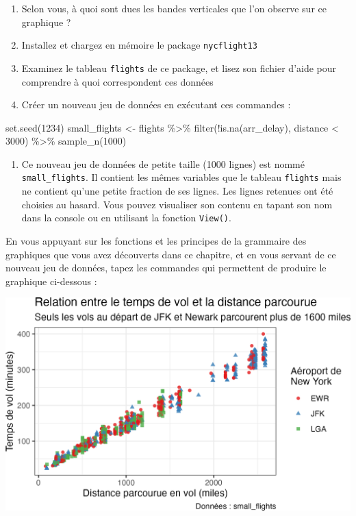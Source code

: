 \documentclass[
  letterpaper,
  DIV=11,
  numbers=noendperiod]{scrreprt}
\newenvironment{Shaded}{\begin{snugshade}}{\end{snugshade}}
\newcommand{\DecValTok}[1]{\textcolor[rgb]{0.68,0.00,0.00}{#1}}
\newcommand{\FunctionTok}[1]{\textcolor[rgb]{0.28,0.35,0.67}{#1}}
\newcommand{\NormalTok}[1]{\textcolor[rgb]{0.00,0.23,0.31}{#1}}
\newcommand{\OtherTok}[1]{\textcolor[rgb]{0.00,0.23,0.31}{#1}}
\newcommand{\SpecialCharTok}[1]{\textcolor[rgb]{0.37,0.37,0.37}{#1}}
\providecommand{\tightlist}{%
  \setlength{\itemsep}{0pt}\setlength{\parskip}{0pt}}\usepackage{longtable,booktabs,array}
\begin{document}
\begin{enumerate}
\def\labelenumi{\arabic{enumi}.}
\setcounter{enumi}{2}
\item
  Selon vous, à quoi sont dues les bandes verticales que l'on observe
  sur ce graphique ?
\item
  Installez et chargez en mémoire le package \texttt{nycflight13}
\item
  Examinez le tableau \texttt{flights} de ce package, et lisez son
  fichier d'aide pour comprendre à quoi correspondent ces données
\item
  Créer un nouveau jeu de données en exécutant ces commandes :
\end{enumerate}

\begin{Shaded}
\begin{Highlighting}[]
\FunctionTok{set.seed}\NormalTok{(}\DecValTok{1234}\NormalTok{)}
\NormalTok{small\_flights }\OtherTok{\textless{}{-}}\NormalTok{ flights }\SpecialCharTok{\%\textgreater{}\%}
  \FunctionTok{filter}\NormalTok{(}\SpecialCharTok{!}\FunctionTok{is.na}\NormalTok{(arr\_delay),}
\NormalTok{         distance }\SpecialCharTok{\textless{}} \DecValTok{3000}\NormalTok{)  }\SpecialCharTok{\%\textgreater{}\%}
  \FunctionTok{sample\_n}\NormalTok{(}\DecValTok{1000}\NormalTok{)}
\end{Highlighting}
\end{Shaded}

\begin{enumerate}
\def\labelenumi{\arabic{enumi}.}
\setcounter{enumi}{6}
\tightlist
\item
  Ce nouveau jeu de données de petite taille (1000 lignes) est nommé
  \texttt{small\_flights}. Il contient les mêmes variables que le
  tableau \texttt{flights} mais ne contient qu'une petite fraction de
  ses lignes. Les lignes retenues ont été choisies au hasard. Vous
  pouvez visualiser son contenu en tapant son nom dans la console ou en
  utilisant la fonction \texttt{View()}.
\end{enumerate}

En vous appuyant sur les fonctions et les principes de la grammaire des
graphiques que vous avez découverts dans ce chapitre, et en vous servant
de ce nouveau jeu de données, tapez les commandes qui permettent de
produire le graphique ci-dessous :

\includegraphics{./03-visualization_files/figure-pdf/unnamed-chunk-116-1.png}
\end{document}

